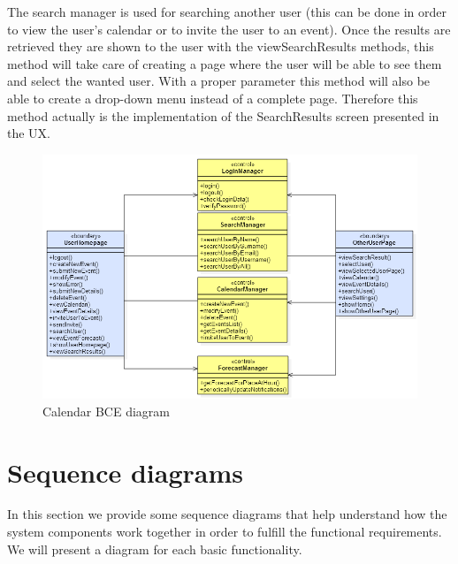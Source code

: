 \documentclass[10pt,a4paper,titlepage]{article}
\begin{document}
The search manager is used for searching another user (this can be done in order to view the user's calendar or to invite the user to an event). Once the results are retrieved they are shown to the user with the viewSearchResults methods, this method will take care of creating a page where the user will be able to see them and select the wanted user. With a proper parameter this method will also be able to create a drop-down menu instead of a complete page. Therefore this method actually is the implementation of the SearchResults screen presented in the UX.
\begin{figure}[h]
\centering
\includegraphics[width=\linewidth]{./bce/calendar_bce}
\caption[calendar bce]{Calendar BCE diagram}
\label{fig:calendar_bce}
\end{figure}

\clearpage
\section{Sequence diagrams}
In this section we provide some sequence diagrams that help understand how the system components work together in order to fulfill the functional requirements. We will present a diagram for each basic functionality.
\end{document}

